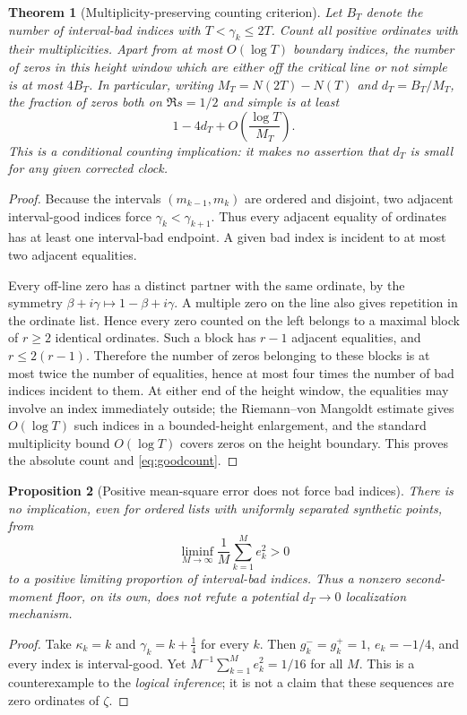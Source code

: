 \documentclass[11pt,reqno]{amsart}
\numberwithin{equation}{section}
\newtheorem{theorem}{Theorem}[section]
\newtheorem{proposition}[theorem]{Proposition}
\begin{document}
\begin{theorem}[Multiplicity-preserving counting criterion]
\label{thm:goodcount}
Let $B_T$ denote the number of interval-bad indices with
$T<\gamma_k\le2T$. Count all positive ordinates with their
multiplicities. Apart from at most $O(\log T)$ boundary indices,
the number of zeros in this height window which are either off the
critical line or not simple is at most $4B_T$. In particular, writing
$M_T=N(2T)-N(T)$ and $d_T=B_T/M_T$, the fraction of zeros both on
$\Re s=1/2$ and simple is at least
\begin{equation}\label{eq:goodcount}
1-4d_T+O\left(\frac{\log T}{M_T}\right).
\end{equation}
This is a conditional counting implication: it makes no assertion that
$d_T$ is small for any given corrected clock.
\end{theorem}
\begin{proof}
Because the intervals $(m_{k-1},m_k)$ are ordered and disjoint,
two adjacent interval-good indices force
$\gamma_k<\gamma_{k+1}$. Thus every adjacent equality of ordinates
has at least one interval-bad endpoint. A given bad index is incident
to at most two adjacent equalities.

Every off-line zero has a distinct partner with the same ordinate,
by the symmetry $\beta+i\gamma\mapsto1-\beta+i\gamma$.
A multiple zero on the line also gives repetition in the ordinate
list. Hence every zero counted on the left belongs to a maximal
block of $r\ge2$ identical ordinates. Such a block has $r-1$
adjacent equalities, and $r\le2(r-1)$.
Therefore the number of zeros belonging to these blocks is at most
twice the number of equalities, hence at most four times the number
of bad indices incident to them. At either end of the height window,
the equalities may involve an index immediately outside; the
Riemann--von Mangoldt estimate gives $O(\log T)$ such indices in
a bounded-height enlargement, and the standard multiplicity bound
$O(\log T)$ covers zeros on the height boundary. This proves the
absolute count and \eqref{eq:goodcount}.
\end{proof}

\begin{proposition}[Positive mean-square error does not force bad indices]
\label{prop:floornoobstruction}
There is no implication, even for ordered lists with uniformly separated
synthetic points, from
\[
\liminf_{M\to\infty}\frac1M\sum_{k=1}^M e_k^2>0
\]
to a positive limiting proportion of interval-bad indices. Thus a
nonzero second-moment floor, on its own, does not refute a
potential $d_T\to0$ localization mechanism.
\end{proposition}
\begin{proof}
Take $\kappa_k=k$ and $\gamma_k=k+\frac14$ for every $k$.
Then $g_k^-=g_k^+=1$, $e_k=-1/4$, and every index is
interval-good. Yet $M^{-1}\sum_{k=1}^M e_k^2=1/16$ for all $M$.
This is a counterexample to the \emph{logical inference}; it is not a
claim that these sequences are zero ordinates of $\zeta$.
\end{proof}
\end{document}
